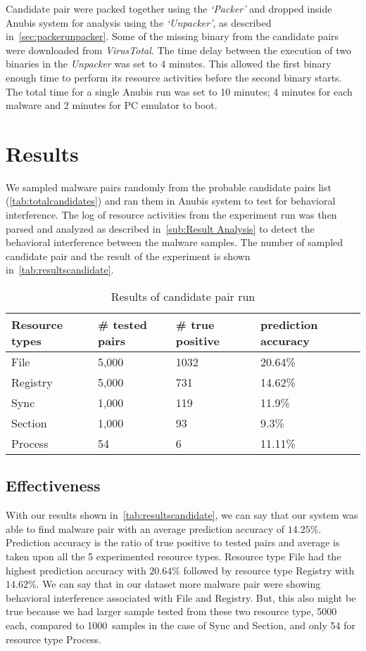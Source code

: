 Candidate pair were packed together using the \emph{`Packer'} and dropped inside Anubis system for analysis using the \emph{`Unpacker'}, as described in~\ref{sec:packerunpacker}.
Some of the missing binary from the candidate pairs were downloaded from \emph{VirusTotal}.
The time delay between the execution of two binaries in the \emph{Unpacker} was set to 4 minutes.
This allowed the first binary enough time to perform its resource activities before the second binary starts.
The total time for a single Anubis run was set to 10 minutes; 4 minutes for each malware and 2 minutes for PC emulator to boot.
\section{Results}
\label{sec:Results}
We sampled malware pairs randomly from the probable candidate pairs list (\autoref{tab:totalcandidates}) and ran them in Anubis system to test for behavioral interference.
The log of resource activities from the experiment run was then parsed and analyzed as described in~\autoref{sub:Result Analysis} to detect the behavioral interference between the malware samples.
The number of sampled candidate pair and the result of the experiment is shown in~\autoref{tab:resultscandidate}.
\begin{table}[ht]
  \caption[Results of candidate pair run]{Results of candidate pair run}\label{tab:resultscandidate}
  \centering
  \begin{tabular}{l l l l}
    \toprule
    Resource types & \# tested pairs & \# true positive & prediction accuracy\\
    \midrule
    File & 5,000 & 1032& 20.64\%\\
    Registry & 5,000 & 731& 14.62\%\\
    Sync & 1,000 & 119& 11.9\%\\
    Section & 1,000 & 93& 9.3\%\\
    Process & 54 & 6& 11.11\%\\
    \bottomrule
  \end{tabular}
\end{table}
\subsection{Effectiveness}
\label{sub:Effectiveness}
With our results shown in~\autoref{tab:resultscandidate}, we can say that our system was able to find malware pair with an average prediction accuracy of $14.25\%$.
Prediction accuracy is the ratio of true positive to tested pairs and average is taken upon all the 5 experimented resource types.
Resource type File had the highest prediction accuracy with $20.64\%$ followed by resource type Registry with $14.62\%$.
We can say that in our dataset more malware pair were showing behavioral interference associated with File and Registry.
But, this also might be true because we had larger sample tested from these two resource type, 5000 each, compared to 1000\ samples in the case of Sync and Section, and only 54 for resource type Process.
